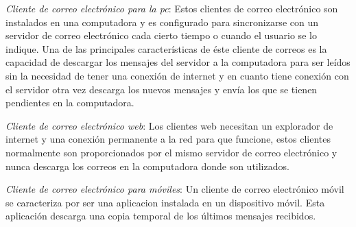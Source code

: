 \documentclass[12pt,oneside,onecolumn,openany]{report}
\begin{document}
\begin{itemize}
 \textit{Cliente de correo electrónico para la pc}:
Estos clientes de correo electrónico son instalados en una computadora y es configurado para sincronizarse con un servidor de correo electrónico cada cierto tiempo o cuando el usuario se lo indique. 
Una  de  las  principales  características  de  éste  cliente  de  correos  es  la  capacidad  de descargar los mensajes del servidor a la computadora para ser leídos sin la necesidad de tener  una  conexión  de  internet  y  en  cuanto  tiene  conexión  con  el  servidor  otra  vez 
descarga los nuevos mensajes y envía los que se tienen pendientes en la computadora. 

 \textit{Cliente de correo electrónico web}:
Los  clientes  web  necesitan  un  explorador  de  internet  y  una  conexión  permanente  a  la red  para  que  funcione,  estos  clientes  normalmente  son  proporcionados  por  el  mismo servidor de correo electrónico y nunca descarga los correos en la computadora donde son utilizados. 

 \textit{Cliente de correo electrónico para móviles}:
Un  cliente  de  correo electrónico  móvil  se  caracteriza  por  ser una  aplicacion  instalada  en  un dispositivo  móvil. Esta aplicación descarga una copia temporal de los últimos mensajes recibidos.  


\end{itemize}
\end{document}
